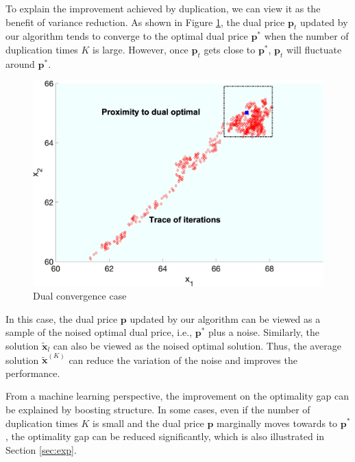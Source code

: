 \documentclass{article} %
\begin{document}
To explain the improvement achieved by duplication, we can view it as the benefit of variance reduction. As shown in Figure \ref{fig:dual_cov}, the dual price $\bm{p}_t$ updated by our algorithm tends to converge to the optimal dual price $\bm{p}^*$ when the number of duplication times $K$ is large. However, once $\bm{p}_t$ gets close to $\bm{p}^*$, $\bm{p}_t$ will fluctuate around $\bm{p}^*$. 
\begin{figure}
    \centering
    \includegraphics[width=.5\linewidth]{dualcov.png}
    \centering\caption{Dual convergence case}
    \label{fig:dual_cov}
\end{figure}

In this case, the dual price $\bm{p}$ updated by our algorithm can be viewed as a sample of the noised optimal dual price, i.e., $\bm{p}^*$ plus a noise. Similarly, the solution $\tilde{\bm{x}}_{l}$ can also be viewed as the noised optimal solution. Thus, the average solution $\tilde{\bm{x}}^{(K)}$ can reduce the variation of the noise and improves the performance.

From a machine learning perspective, the improvement on the optimality gap can be explained by boosting structure. In some cases, even if the number of duplication times $K$ is small and the dual price $\bm{p}$ marginally moves towards to $\bm{p}^*$, the optimality gap can be reduced significantly, which is also illustrated in Section \ref{sec:exp}. 
\end{document}
